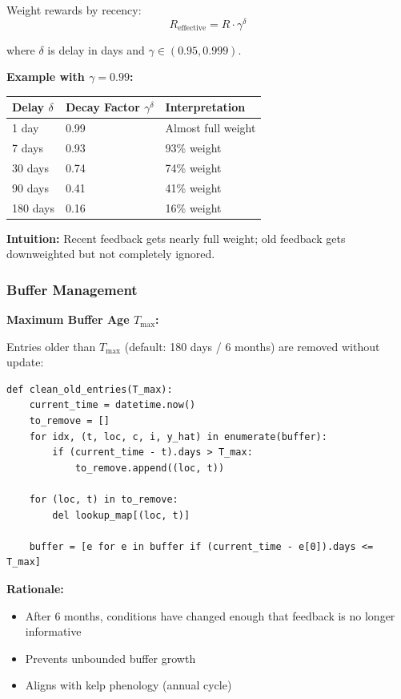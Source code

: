 \documentclass[11pt]{article}
\begin{document}
Weight rewards by recency:
\[
R_{\text{effective}} = R \cdot \gamma^{\delta}
\]

where $\delta$ is delay in days and $\gamma \in (0.95, 0.999)$.

\textbf{Example with $\gamma = 0.99$:}
\begin{center}
\begin{tabular}{lll}
\toprule
\textbf{Delay $\delta$} & \textbf{Decay Factor $\gamma^{\delta}$} & \textbf{Interpretation} \\
\midrule
1 day & 0.99 & Almost full weight \\
7 days & 0.93 & 93\% weight \\
30 days & 0.74 & 74\% weight \\
90 days & 0.41 & 41\% weight \\
180 days & 0.16 & 16\% weight \\
\bottomrule
\end{tabular}
\end{center}

\textbf{Intuition:} Recent feedback gets nearly full weight; old feedback gets downweighted but not completely ignored.

\subsubsection{Buffer Management}

\textbf{Maximum Buffer Age $T_{\text{max}}$:}

Entries older than $T_{\text{max}}$ (default: 180 days / 6 months) are removed without update:

\begin{verbatim}
def clean_old_entries(T_max):
    current_time = datetime.now()
    to_remove = []
    for idx, (t, loc, c, i, y_hat) in enumerate(buffer):
        if (current_time - t).days > T_max:
            to_remove.append((loc, t))

    for (loc, t) in to_remove:
        del lookup_map[(loc, t)]

    buffer = [e for e in buffer if (current_time - e[0]).days <= T_max]
\end{verbatim}

\textbf{Rationale:}
\begin{itemize}
    \item After 6 months, conditions have changed enough that feedback is no longer informative
    \item Prevents unbounded buffer growth
    \item Aligns with kelp phenology (annual cycle)
\end{itemize}
\end{document}
